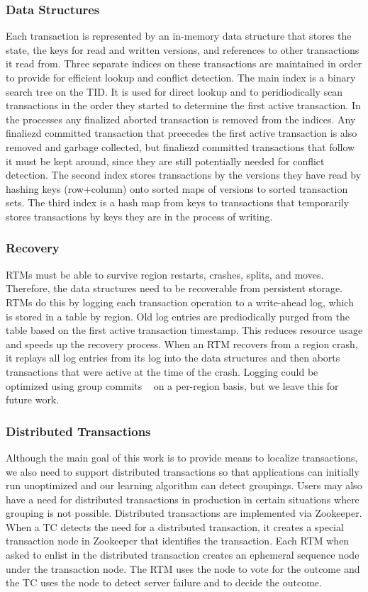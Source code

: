 \documentclass[10pt,final,journal]{IEEEtran}
\begin{document}
\subsubsection{Data Structures}
Each transaction is represented by an in-memory data structure that stores the state, the keys for read and written versions, and references to other transactions it read from. Three separate indices on these transactions are maintained in order to provide for efficient lookup and conflict detection. The main index is a binary search tree on the TID. It is used for direct lookup and to peridiodically scan transactions in the order they started to determine the first active transaction. In the processes any finalized aborted transaction is removed from the indices. Any finaliezd committed transaction that preecedes the first active transaction is also removed and garbage collected, but finaliezd committed transactions that follow it must be kept around, since they are still potentially needed for conflict detection. The second index stores transactions by the versions they have read by hashing keys (row+column) onto sorted maps of versions to sorted transaction sets. The third index is a hash map from keys to transactions that temporarily stores transactions by keys they are in the process of writing.

\subsubsection{Recovery}
RTMs must be able to survive region restarts, crashes, splits, and moves. Therefore, the data structures need to be recoverable from persistent storage. RTMs do this by logging each transaction operation to a write-ahead log, which is stored in a table by region. Old log entries are prediodically purged from the table based on the first active transaction timestamp. This reduces resource usage and speeds up the recovery process. When an RTM recovers from a region crash, it replays all log entries from its log into the data structures and then aborts transactions that were active at the time of the crash. Logging could be optimized using group commits ~\cite{eikum:2001:TIS} on a per-region basis, but we leave this for future work.

\subsubsection{Distributed Transactions}
Although the main goal of this work is to provide means to localize transactions, we also need to support distributed transactions so that applications can initially run unoptimized and our learning algorithm can detect groupings. Users may also have a need for distributed transactions in production in certain situations where grouping is not possible. Distributed transactions are implemented via Zookeeper. When a TC detects the need for a distributed transaction, it creates a special transaction node in Zookeeper that identifies the transaction. Each RTM when asked to enlist in the distributed transaction creates an ephemeral sequence node under the transaction node. The RTM uses the node to vote for the outcome and the TC uses the node to detect server failure and to decide the outcome.
\end{document}
